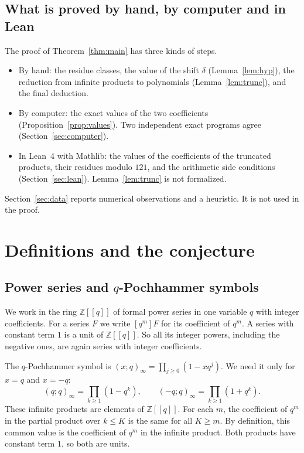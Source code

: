 \documentclass[11pt]{amsart}
\theoremstyle{definition}
\theoremstyle{remark}
\newcommand{\Z}{\mathbb{Z}}
\newcommand{\poch}[2]{(#1;#2)_{\infty}}
\newcommand{\cf}[1]{[q^{#1}]}
\begin{document}
\subsection*{What is proved by hand, by computer and in Lean}
The proof of Theorem~\ref{thm:main} has three kinds of steps.
\begin{itemize}
\item By hand: the residue classes, the value of the shift \(\delta\) (Lemma~\ref{lem:hyp}), the reduction from infinite products to polynomials (Lemma~\ref{lem:trunc}), and the final deduction.
\item By computer: the exact values of the two coefficients (Proposition~\ref{prop:values}). Two independent exact programs agree (Section~\ref{sec:computer}).
\item In Lean~4 with Mathlib: the values of the coefficients of the truncated products, their residues modulo \(121\), and the arithmetic side conditions (Section~\ref{sec:lean}). Lemma~\ref{lem:trunc} is not formalized.
\end{itemize}
Section~\ref{sec:data} reports numerical observations and a heuristic. It is not used in the proof.

\section{Definitions and the conjecture}\label{sec:defs}

\subsection{Power series and \texorpdfstring{\(q\)}{q}-Pochhammer symbols}
We work in the ring \(\Z[[q]]\) of formal power series in one variable \(q\) with integer coefficients. For a series \(F\) we write \(\cf{m}F\) for its coefficient of \(q^m\). A series with constant term \(1\) is a unit of \(\Z[[q]]\). So all its integer powers, including the negative ones, are again series with integer coefficients.

The \(q\)-Pochhammer symbol is \((x;q)_\infty=\prod_{j\ge0}(1-xq^j)\). We need it only for \(x=q\) and \(x=-q\):
\begin{equation}\label{eq:poch}
\poch{q}{q}=\prod_{k\ge1}(1-q^k),\qquad \poch{-q}{q}=\prod_{k\ge1}(1+q^k).
\end{equation}
These infinite products are elements of \(\Z[[q]]\). For each \(m\), the coefficient of \(q^m\) in the partial product over \(k\le K\) is the same for all \(K\ge m\). By definition, this common value is the coefficient of \(q^m\) in the infinite product. Both products have constant term \(1\), so both are units.
\end{document}
